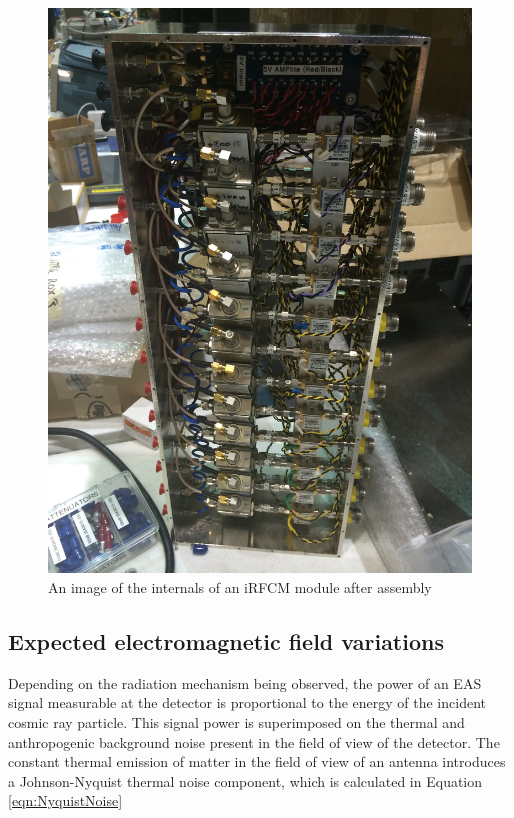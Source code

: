 	
\begin{figure}
\centering
	\includegraphics[height=0.9\textheight]{figures/IRFCMpic}
	\caption{An image of the internals of an iRFCM module after assembly}
	\label{fig:IRFCMpic}
\end{figure}
	
	
	\subsection{Expected electromagnetic field variations}
		Depending on the radiation mechanism being observed, the power of an EAS signal measurable at the detector is proportional to the energy of the incident cosmic ray particle.\cite{EASSignalPower}  This signal power is superimposed on the thermal and anthropogenic background noise present in the field of view of the detector.  The constant thermal emission of matter in the field of view of an antenna introduces a Johnson-Nyquist thermal noise component, which is calculated in Equation \ref{eqn:NyquistNoise}

